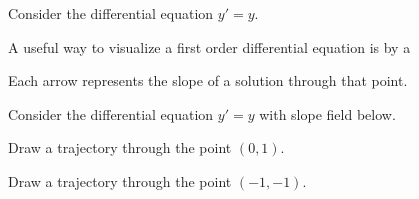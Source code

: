 \begin{applicationActivities}
\begin{observation}
Consider the differential equation \(y'=y\).

A useful way to visualize a first order differential equation is by a 


\begin{center}\end{center}
Each arrow represents the slope of a solution  through that point.
\end{observation}

\begin{activity}{5}
Consider the differential equation \(y'=y\) with slope field below.

\begin{center}\end{center}
\begin{subactivity}
Draw a trajectory through the point \((0,1)\).
\end{subactivity}
\begin{subactivity}
Draw a trajectory through the point \((-1,-1)\).
\end{subactivity}
\end{activity}



\end{applicationActivities}
